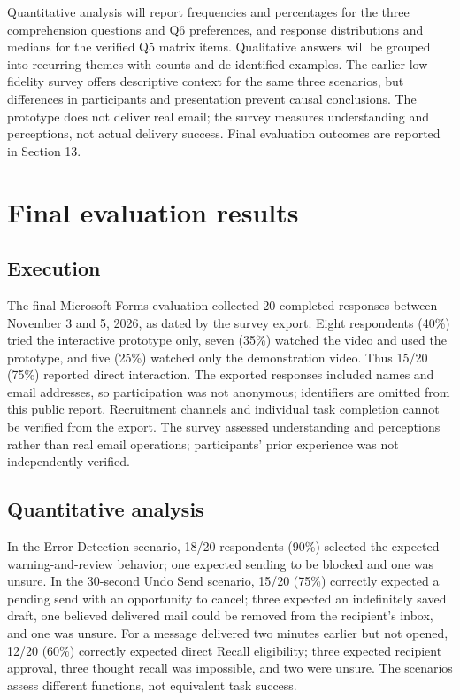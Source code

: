 \documentclass[letterpaper]{jdf}
\begin{document}
Quantitative analysis will report frequencies and percentages for the three comprehension questions and Q6 preferences, and response distributions and medians for the verified Q5 matrix items. Qualitative answers will be grouped into recurring themes with counts and de-identified examples. The earlier low-fidelity survey offers descriptive context for the same three scenarios, but differences in participants and presentation prevent causal conclusions. The prototype does not deliver real email; the survey measures understanding and perceptions, not actual delivery success. Final evaluation outcomes are reported in Section 13.

\section{Final evaluation results}
\subsection{Execution}
The final Microsoft Forms evaluation collected 20 completed responses between November 3 and 5, 2026, as dated by the survey export. Eight respondents (40\%) tried the interactive prototype only, seven (35\%) watched the video and used the prototype, and five (25\%) watched only the demonstration video. Thus 15/20 (75\%) reported direct interaction. The exported responses included names and email addresses, so participation was not anonymous; identifiers are omitted from this public report. Recruitment channels and individual task completion cannot be verified from the export. The survey assessed understanding and perceptions rather than real email operations; participants' prior experience was not independently verified.

\subsection{Quantitative analysis}
In the Error Detection scenario, 18/20 respondents (90\%) selected the expected warning-and-review behavior; one expected sending to be blocked and one was unsure. In the 30-second Undo Send scenario, 15/20 (75\%) correctly expected a pending send with an opportunity to cancel; three expected an indefinitely saved draft, one believed delivered mail could be removed from the recipient's inbox, and one was unsure. For a message delivered two minutes earlier but not opened, 12/20 (60\%) correctly expected direct Recall eligibility; three expected recipient approval, three thought recall was impossible, and two were unsure. The scenarios assess different functions, not equivalent task success.
\end{document}
